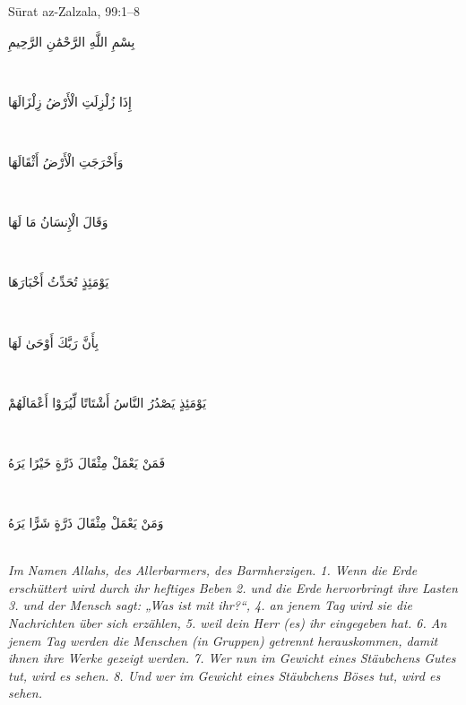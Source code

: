 \begin{quranvers}{Sūrat az-Zalzala, 99:1--8}
{\quranfont\begin{Arabic}
بِسْمِ اللَّهِ الرَّحْمَٰنِ الرَّحِيمِ
\end{Arabic}}\\[2mm]
{\quranfont\begin{Arabic}
إِذَا زُلْزِلَتِ الْأَرْضُ زِلْزَالَهَا
\end{Arabic}}\\[2mm]
{\quranfont\begin{Arabic}
وَأَخْرَجَتِ الْأَرْضُ أَثْقَالَهَا
\end{Arabic}}\\[2mm]
{\quranfont\begin{Arabic}
وَقَالَ الْإِنسَانُ مَا لَهَا
\end{Arabic}}\\[2mm]
{\quranfont\begin{Arabic}
يَوْمَئِذٍ تُحَدِّثُ أَخْبَارَهَا
\end{Arabic}}\\[2mm]
{\quranfont\begin{Arabic}
بِأَنَّ رَبَّكَ أَوْحَىٰ لَهَا
\end{Arabic}}\\[2mm]
{\quranfont\begin{Arabic}
يَوْمَئِذٍ يَصْدُرُ النَّاسُ أَشْتَاتًا لِّيُرَوْا أَعْمَالَهُمْ
\end{Arabic}}\\[2mm]
{\quranfont\begin{Arabic}
فَمَنْ يَعْمَلْ مِثْقَالَ ذَرَّةٍ خَيْرًا يَرَهُ
\end{Arabic}}\\[2mm]
{\quranfont\begin{Arabic}
وَمَنْ يَعْمَلْ مِثْقَالَ ذَرَّةٍ شَرًّا يَرَهُ
\end{Arabic}}\\[3mm]
\emph{Im Namen Allahs, des Allerbarmers, des Barmherzigen. 1. Wenn die Erde erschüttert wird
durch ihr heftiges Beben 2. und die Erde hervorbringt ihre Lasten 3. und der Mensch sagt: „Was
ist mit ihr?“, 4. an jenem Tag wird sie die Nachrichten über sich erzählen, 5. weil dein Herr (es)
ihr eingegeben hat. 6. An jenem Tag werden die Menschen (in Gruppen) getrennt herauskommen,
damit ihnen ihre Werke gezeigt werden. 7. Wer nun im Gewicht eines Stäubchens Gutes tut, wird
es sehen. 8. Und wer im Gewicht eines Stäubchens Böses tut, wird es sehen.}
\end{quranvers}

